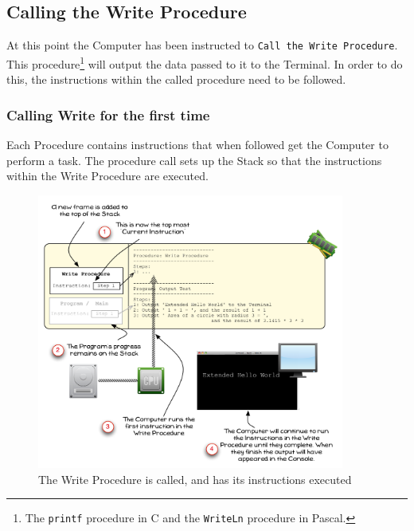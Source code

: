 
\clearpage
\subsection{Calling the Write Procedure} %
\label{sub:calling_a_procedure}

At this point the Computer has been instructed to \texttt{Call the Write Procedure}. This procedure\footnote{The \texttt{printf} procedure in C and the \texttt{WriteLn} procedure in Pascal.} will output the data passed to it to the Terminal. In order to do this, the instructions within the called procedure need to be followed.

\subsubsection{Calling Write for the first time} %
\label{ssub:calling_write_for_the_first_time}

Each Procedure contains instructions that when followed get the Computer to perform a task. The procedure call sets up the Stack so that the instructions within the Write Procedure are executed.

\begin{figure}[htbp]
   \centering
   \includegraphics[width=0.9\textwidth]{./topics/program-creation/images/ProgramExecution05} 
   \caption{The Write Procedure is called, and has its instructions executed}
   \label{fig:program-creation-visualise-helloworld-5}
\end{figure}

